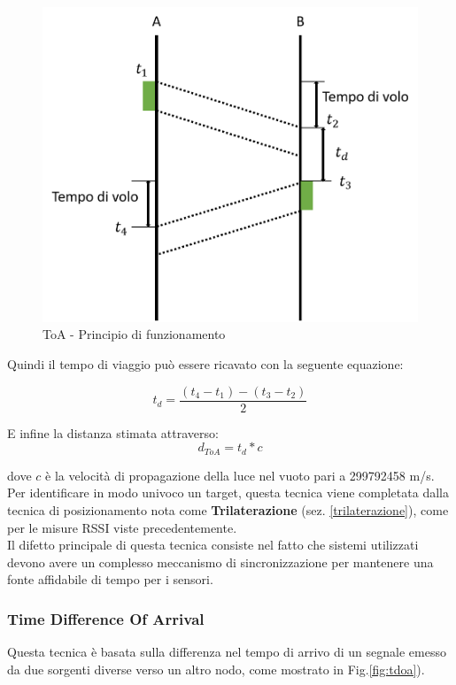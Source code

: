 \begin{figure}[H]  
	\centering 
	\includegraphics[scale=0.4]{ContestoApplicativo/toa.png}
	\caption{ToA - Principio di funzionamento}
	\label{fig:toa}
\end{figure}

Quindi il tempo di viaggio può essere ricavato con la seguente equazione:

\begin{equation}
t_d = \dfrac{(t_4 - t_1) - (t_3 - t_2)}{2}
\label{td}
\end{equation}

E infine la distanza stimata attraverso:
\begin{equation}
d_{ToA} = t_d * c
\label{eq:toa}
\end{equation}

dove $c$ è la velocità di propagazione della luce nel vuoto pari a 299792458 m/s. Per identificare in modo univoco un target, questa tecnica viene completata dalla tecnica di posizionamento nota come \textbf{Trilaterazione} (sez. \ref{trilaterazione}), come per le misure RSSI viste precedentemente.\\
Il difetto principale di questa tecnica consiste nel fatto che sistemi utilizzati devono avere un complesso meccanismo di sincronizzazione per mantenere una fonte affidabile di tempo per i sensori\cite{toaProblem}.

\subsubsection{Time Difference Of Arrival}
\label{tdoa}
Questa tecnica è basata sulla differenza nel tempo di arrivo di un segnale emesso da due sorgenti diverse verso un altro nodo, come mostrato in Fig.\ref{fig:tdoa}).

